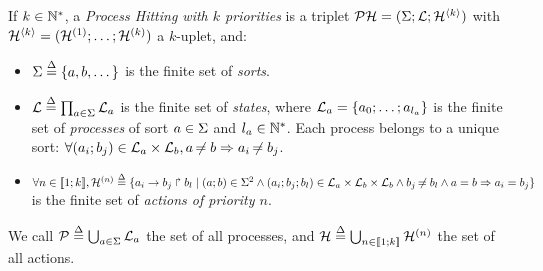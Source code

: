 \begin{definition} 
\label{def:ph}
  If $k \in \mathbb{N}^*$, a \emph{Process Hitting with $k$ priorities} is a triplet $\mathcal{PH} = (\Sigma; \mathcal{L}; \mathcal{H}^{\langle k \rangle})$ with $\mathcal{H}^{\langle k \rangle} = (\mathcal{H}^{(1)}; \dots; \mathcal{H}^{(k)})$ a $k$-uplet, and:
  \begin{itemize}
    \item $\Sigma \stackrel{\Delta}= \{a,b,\dots\}$ is the finite set of \emph{sorts}.
    \item $\mathcal{L} \stackrel{\Delta}= \prod_{a \in \Sigma} \mathcal{L}_a$ is the finite set of \emph{states}, where $\mathcal{L}_a = \{a_0 ; \ldots ; a_{l_a}\}$ is the finite set of \emph{processes} of sort $a \in \Sigma$ and $l_a \in \mathbb{N}^*$. Each process belongs to a unique sort: $\forall (a_i; b_j) \in \mathcal{L}_a \times \mathcal{L}_b, a \not\nobreak\mkern -2mu = b \Rightarrow a_i \not\nobreak\mkern -2mu = b_j$.
    \item $\forall n \in \llbracket 1; k \rrbracket, \mathcal{H}^{(n)} \stackrel{\Delta}= \{a_i\rightarrow b_j\Rsh b_l \mid (a; b) \in \Sigma^2 \wedge (a_i; b_j; b_l) \in \mathcal{L}_a \times \mathcal{L}_b \times \mathcal{L}_b \wedge b_j \not\nobreak\mkern -2mu = b_l \wedge a = b \Rightarrow a_i = b_j \}$ is the finite set of \emph{actions of priority $n$}.
  \end{itemize}
  We call $\mathcal{P} \stackrel{\Delta}= \bigcup_{a \in \Sigma} \mathcal{L}_a$ the set of all processes, and $\mathcal{H} \stackrel{\Delta}= \bigcup_{n \in \llbracket 1; k \rrbracket} \mathcal{H}^{(n)}$ the set of all actions.
\end{definition}

